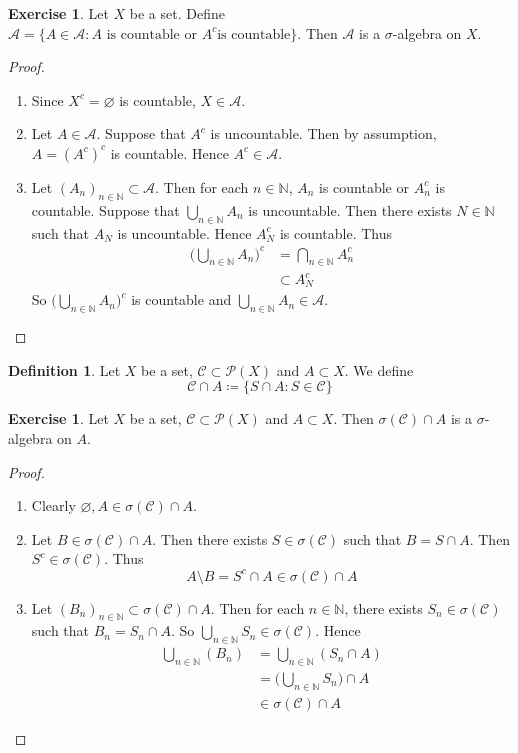 \documentclass[12pt]{amsart}
\theoremstyle{definition}
\newtheorem{defn}[definition]{Definition}
\newtheorem{ex}[definition]{Exercise}
\newcommand{\sig}{\sigma}
\newcommand{\N}{\mathbb{N}}
\newcommand{\MA}{\mathcal{A}}
\newcommand{\MC}{\mathcal{C}}
\newcommand{\MP}{\mathcal{P}}
\begin{document}
	\begin{ex}
		Let $X$ be a set. Define $\MA = \{A \in \MA: A \text{ is countable or }A^c  \text{is countable}\}$. Then $\MA$ is a $\sig$-algebra on $X$.
	\end{ex}
	
	\begin{proof}\
		\begin{enumerate}
			\item Since $X^c = \varnothing$ is countable, $X \in \MA$.
			\item Let $A \in \MA$. Suppose that $A^c$ is  uncountable. Then by assumption, $A = (A^c)^c$ is countable. Hence $A^c \in \MA$.
			\item Let $(A_n)_{n \in \N} \subset \MA$. Then for each $n \in \N$, $A_n$ is countable or $A_n^c$ is countable. Suppose that $\bigcup\limits_{n \in \N}A_n$ is uncountable. Then there exists $N \in \N$ such that $A_N$ is uncountable. Hence $A_N^c$ is countable. Thus 
			\begin{align*}
				\bigg(\bigcup_{n \in \N}A_n \bigg)^c 
				&= \bigcap_{n \in \N}A_n^c \\
				& \subset A_N^c 
			\end{align*}
			So $\bigg(\bigcup\limits_{n \in \N}A_n \bigg)^c $ is countable and $\bigcup\limits_{n \in \N}A_n \in \MA$. 
		\end{enumerate}
	\end{proof}
	
	\begin{defn}
		Let $X$ be a set, $\MC \subset \MP(X)$ and $A \subset X$. We define $$\MC \cap A \coloneqq \{S \cap A: S \in \MC\}$$ 
	\end{defn}
	
	\begin{ex}
		Let $X$ be a set, $\MC \subset \MP(X)$ and $A \subset X$. Then 
		$\sig(\MC) \cap A$ is a $\sig$-algebra on $A$. 
	\end{ex}
	
	\begin{proof}\
		\begin{enumerate}
			\item Clearly $\varnothing, A \in \sig(\MC) \cap A$.
			\item Let $B \in \sig(\MC) \cap A$. Then there exists $S \in \sig(\MC)$ such that $B = S \cap A$. Then $S^c \in \sig(\MC)$. Thus $$A \setminus B = S^c \cap A \in \sig(\MC) \cap A$$
			\item Let $(B_n)_{n \in \N} \subset \sig(\MC) \cap A$. Then for each $n \in \N$, there exists $S_n \in \sig(\MC)$ such that $B_n = S_n \cap A$. So $\bigcup\limits_{n \in \N}S_n \in \sig(\MC)$. Hence 
			\begin{align*}
				\bigcup_{n \in \N}(B_n) 
				&= \bigcup_{n \in \N}(S_n \cap A) \\
				&= \bigg( \bigcup_{n \in \N}S_n \bigg) \cap A \\
				& \in \sig(\MC) \cap A
			\end{align*}
		\end{enumerate}
	\end{proof}
	
\end{document}
